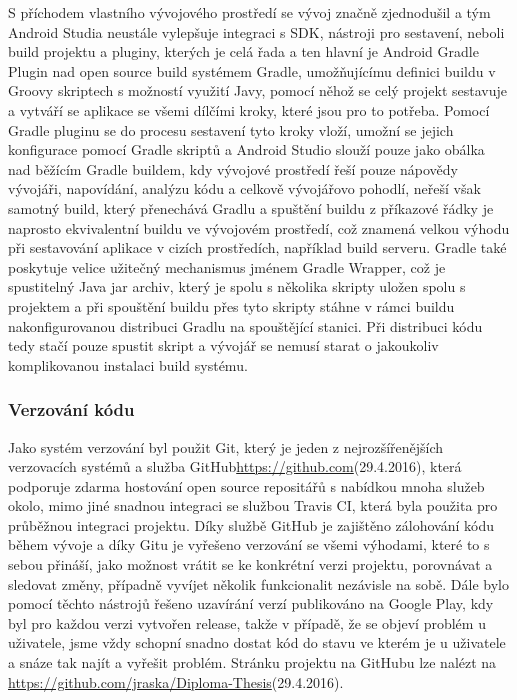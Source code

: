 \documentclass[czech,master,public,dept460,male,java,cpdeclaration]{diploma}
\begin{document}
S příchodem vlastního vývojového prostředí se vývoj značně zjednodušil a tým Android Studia neustále vylepšuje integraci s SDK,
nástroji pro sestavení, neboli build projektu a pluginy, kterých je celá řada a ten hlavní je Android Gradle Plugin
nad open source build systémem Gradle, umožňujícímu definici buildu v Groovy skriptech s možností využití Javy,
 pomocí něhož se celý projekt sestavuje a vytváří se aplikace se všemi dílčími kroky, které jsou pro to potřeba.
Pomocí Gradle pluginu se do procesu sestavení tyto kroky vloží, umožní se jejich konfigurace pomocí Gradle skriptů
a Android Studio slouží pouze jako obálka nad běžícím Gradle buildem, kdy vývojové prostředí řeší pouze nápovědy vývojáři,
napovídání, analýzu kódu a celkově vývojářovo pohodlí, neřeší však samotný build, který přenechává Gradlu a spuštění buildu
 z příkazové řádky je naprosto ekvivalentní buildu ve vývojovém prostředí, což znamená velkou výhodu při sestavování aplikace
 v cizích prostředích, například build serveru.
 Gradle také poskytuje velice užitečný mechanismus jménem Gradle Wrapper, což je spustitelný Java jar archiv,
 který je spolu s několika skripty uložen spolu s projektem a při spouštění buildu přes tyto skripty stáhne v rámci
 buildu nakonfigurovanou distribuci Gradlu na spouštějící stanici. Při distribuci kódu tedy stačí pouze spustit
 skript a vývojář se nemusí starat o jakoukoliv komplikovanou instalaci build systému.

 \subsubsection{Verzování kódu}
 Jako systém verzování byl použit Git, který je jeden z nejrozšířenějších verzovacích systémů a služba GitHub\url{https://github.com}(29.4.2016),
 která podporuje zdarma hostování open source repositářů s nabídkou mnoha služeb okolo, mimo jiné snadnou integraci se službou
 Travis CI, která byla použita pro průběžnou integraci projektu. Díky službě GitHub je zajištěno zálohování kódu
 během vývoje a díky Gitu je vyřešeno verzování se všemi výhodami, které to s sebou přináší, jako možnost vrátit se
 ke konkrétní verzi projektu, porovnávat a sledovat změny, případně vyvíjet několik funkcionalit nezávisle na sobě.
 Dále bylo pomocí těchto nástrojů řešeno uzavírání verzí publikováno na Google Play, kdy byl pro každou verzi vytvořen
 release, takže v případě, že se objeví problém u uživatele, jsme vždy schopní snadno dostat kód do stavu
 ve kterém je u uživatele a snáze tak najít a vyřešit problém. Stránku projektu na GitHubu lze nalézt na
 \url{https://github.com/jraska/Diploma-Thesis}(29.4.2016).
\end{document}
